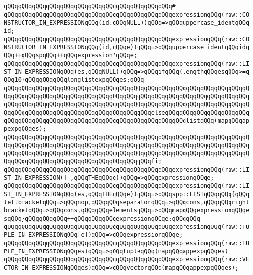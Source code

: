 \verb|qQQqqQQqqQQqqQQqqQQqqQQqqQQqqQQqqQQqqQQqqQQqqQQq#|\newline
\verb|qQQqqQQqqQQqqQQqqQQqqQQqqQQqqQQqqQQqqQQqqQQqqQQqexpressionqQQq(raw::CONSTRUCTOR_IN_EXPRESSIONqQQq(id,qQQqNULL))qQQq=>qQQquppercase_identqQQqid;|\newline
\verb|qQQqqQQqqQQqqQQqqQQqqQQqqQQqqQQqqQQqqQQqqQQqqQQqexpressionqQQq(raw::CONSTRUCTOR_IN_EXPRESSIONqQQq(id,qQQqe))qQQq=>qQQquppercase_identqQQqidqQQq++qQQqspqQQq++qQQqexpression'qQQqe;|\newline
\verb|qQQqqQQqqQQqqQQqqQQqqQQqqQQqqQQqqQQqqQQqqQQqqQQqexpressionqQQq(raw::LIST_IN_EXPRESSIONqQQq(es,qQQqNULL))qQQq=>qQQqifqQQq(lengthqQQqesqQQq>=qQQq10)qQQqqQQqqQQqlonglistexpqQQqes;qQQq|\newline
\verb|qQQqqQQqqQQqqQQqqQQqqQQqqQQqqQQqqQQqqQQqqQQqqQQqqQQqqQQqqQQqqQQqqQQqqQQqqQQqqQQqqQQqqQQqqQQqqQQqqQQqqQQqqQQqqQQqqQQqqQQqqQQqqQQqqQQqqQQqqQQqqQQqqQQqqQQqqQQqqQQqqQQqqQQqqQQqqQQqqQQqqQQqqQQqqQQqqQQqqQQqqQQqqQQqqQQqqQQqqQQqqQQqqQQqqQQqqQQqqQQqqQQqqQQqqQQqelseqQQqqQQqqQQqqQQqqQQqqQQqqQQqqQQqqQQqqQQqqQQqqQQqqQQqqQQqqQQqqQQqqQQqqQQqqQQqlistqQQq(mapqQQqappexpqQQqes);|\newline
\verb|qQQqqQQqqQQqqQQqqQQqqQQqqQQqqQQqqQQqqQQqqQQqqQQqqQQqqQQqqQQqqQQqqQQqqQQqqQQqqQQqqQQqqQQqqQQqqQQqqQQqqQQqqQQqqQQqqQQqqQQqqQQqqQQqqQQqqQQqqQQqqQQqqQQqqQQqqQQqqQQqqQQqqQQqqQQqqQQqqQQqqQQqqQQqqQQqqQQqqQQqqQQqqQQqqQQqqQQqqQQqqQQqqQQqqQQqqQQqqQQqqQQqqQQqqQQqfi;|\newline
\verb|qQQqqQQqqQQqqQQqqQQqqQQqqQQqqQQqqQQqqQQqqQQqqQQqexpressionqQQq(raw::LIST_IN_EXPRESSION([],qQQqTHEqQQqe))qQQq=>qQQqexpressionqQQqe;|\newline
\verb|qQQqqQQqqQQqqQQqqQQqqQQqqQQqqQQqqQQqqQQqqQQqqQQqexpressionqQQq(raw::LIST_IN_EXPRESSIONqQQq(es,qQQqTHEqQQqe))qQQq=>qQQqspp::LISTqQQqqQQq{qQQqleftbracketqQQq=>qQQqnop,qQQqqQQqseparatorqQQq=>qQQqcons,qQQqqQQqrightbracketqQQq=>qQQqcons,qQQqqQQqelementsqQQq=>qQQqmapqQQqexpressionqQQqesqQQq}qQQqqQQqqQQq++qQQqqQQqqQQqexpressionqQQqe;qQQqqQQq|\newline
\verb|qQQqqQQqqQQqqQQqqQQqqQQqqQQqqQQqqQQqqQQqqQQqqQQqexpressionqQQq(raw::TUPLE_IN_EXPRESSIONqQQq[e])qQQq=>qQQqexpressionqQQqe;|\newline
\verb|qQQqqQQqqQQqqQQqqQQqqQQqqQQqqQQqqQQqqQQqqQQqqQQqexpressionqQQq(raw::TUPLE_IN_EXPRESSIONqQQqes)qQQq=>qQQqtupleqQQq(mapqQQqappexpqQQqes);|\newline
\verb|qQQqqQQqqQQqqQQqqQQqqQQqqQQqqQQqqQQqqQQqqQQqqQQqexpressionqQQq(raw::VECTOR_IN_EXPRESSIONqQQqes)qQQq=>qQQqvectorqQQq(mapqQQqappexpqQQqes);|\newline
